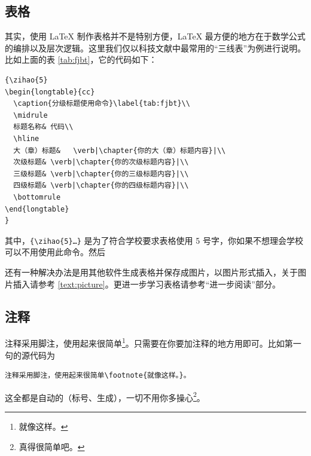 \subsection{表格}
其实，使用 \LaTeX{} 制作表格并不是特别方便，\LaTeX{} 最方便的地方在于数学公式的编排以及层次逻辑。这里我们仅以科技文献中最常用的“三线表”为例进行说明。比如上面的表 \ref{tab:fjbt}，它的代码如下：
\begin{Verbatim}[baselinestretch=0.5,frame=single]
{\zihao{5}
\begin{longtable}{cc}
  \caption{分级标题使用命令}\label{tab:fjbt}\\
  \midrule
  标题名称&	代码\\
  \hline
  大（章）标题&	\verb|\chapter{你的大（章）标题内容}|\\
  次级标题&	\verb|\chapter{你的次级标题内容}|\\
  三级标题&	\verb|\chapter{你的三级标题内容}|\\
  四级标题&	\verb|\chapter{你的四级标题内容}|\\
  \bottomrule
\end{longtable}
}
\end{Verbatim}
其中，\verb|{\zihao{5}…}| 是为了符合学校要求表格使用 5 号字，你如果不想理会学校可以不用使用此命令。然后

还有一种解决办法是用其他软件生成表格并保存成图片，以图片形式插入，关于图片插入请参考 \ref{text:picture}。更进一步学习表格请参考“进一步阅读”部分。

\subsection{注释}
注释采用脚注，使用起来很简单\footnote{就像这样。}。只需要在你要加注释的地方用即可。比如第一句的源代码为
\begin{Verbatim}[baselinestretch=0.5,frame=single]
注释采用脚注，使用起来很简单\footnote{就像这样。}。
\end{Verbatim}
这全都是自动的（标号、生成），一切不用你多操心\footnote{真得很简单吧。}。

